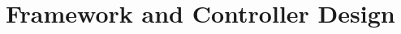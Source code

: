 \documentclass[letterpaper, 10 pt, conference]{ieeeconf}
\newtheorem{definition}{Definition}
\begin{document}





\section{Framework and Controller Design}
\label{sec:frame}
\end{document}
